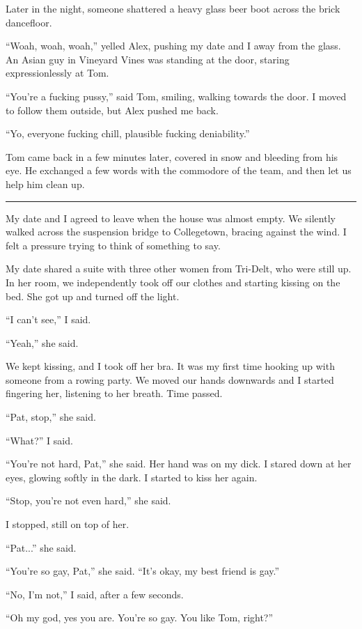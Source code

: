 Later in the night, someone shattered a heavy glass beer boot across the brick
dancefloor.  

``Woah, woah, woah,'' yelled Alex, pushing my date and I away from the glass.
An Asian guy in Vineyard Vines was standing at the door, staring
expressionlessly at Tom.

``You're a fucking pussy,'' said Tom, smiling, walking towards the door.  I
moved to follow them outside, but Alex pushed me back.

``Yo, everyone fucking chill, plausible fucking deniability.''

Tom came back in a few minutes later, covered in snow and bleeding from his eye.
He exchanged a few words with the commodore of the team, and then let us help
him clean up.

\plainfancybreak{12pt}{2}{}

My date and I agreed to leave when the house was almost empty.  We silently
walked across the suspension bridge to Collegetown, bracing against the wind.  I
felt a pressure trying to think of something to say.

My date shared a suite with three other women from Tri-Delt, who were still up.
In her room, we independently took off our clothes and starting kissing on the
bed.  She got up and turned off the light.

``I can't see,'' I said.  

``Yeah,'' she said.

We kept kissing, and I took off her bra.  It was my first time hooking up with
someone from a rowing party.  We moved our hands downwards and I started
fingering her, listening to her breath.  Time passed.

``Pat, stop,'' she said.

``What?'' I said.

``You're not hard, Pat,'' she said.  Her hand was on my dick.  I stared down at
her eyes, glowing softly in the dark.  I started to kiss her again.

``Stop, you're not even hard,'' she said.

I stopped, still on top of her.

``Pat...'' she said.

``You're so gay, Pat,'' she said.  ``It's okay, my best friend is gay.''

``No, I'm not,'' I said, after a few seconds.

``Oh my god, yes you are.  You're so gay.  You like Tom, right?''

